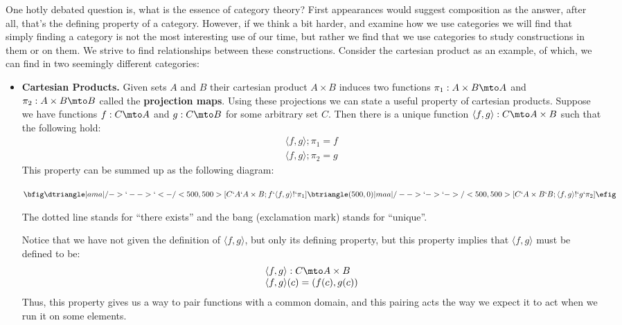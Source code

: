 One hotly debated question is, what is the essence of category theory?
First appearances would suggest composition as the answer, after all,
that's the defining property of a category.  However, if we think a
bit harder, and examine how we use categories we will find that simply
finding a category is not the most interesting use of our time, but
rather we find that we use categories to study constructions in them
or on them.  We strive to find relationships between these
constructions.  Consider the cartesian product as an example, of
which, we can find in two seemingly different categories:
\begin{itemize}
\item \textbf{Cartesian Products.} Given sets $A$ and $B$ their
  cartesian product $A \times B$ induces two functions $\pi_1 : A
  \times B \mto A$ and $\pi_2 : A \times B \mto B$ called the
  \textbf{projection maps}. Using these projections we can state a
  useful property of cartesian products.  Suppose we have functions $f
  : C \mto A$ and $g : C \mto B$ for some arbitrary set $C$.  Then
  there is a unique function $\langle f,g \rangle : C \mto A \times B$
  such that the following hold:
  \[
  \begin{array}{lll}
    \langle f,g \rangle;\pi_1 = f\\
    \langle f,g \rangle;\pi_2 = g
  \end{array}
  \]
  This property can be summed up as the following diagram:
  \begin{center}
    \begin{math}
      \bfig
      \dtriangle|ama|/->`-->`<-/<500,500>[C`A`A \times B;f`\langle f,g \rangle!`\pi_1]
      \btriangle(500,0)|maa|/-->`->`->/<500,500>[C`A \times B`B;\langle f,g \rangle!`g`\pi_2]
      \efig
    \end{math}
  \end{center}
  The dotted line stands for ``there exists'' and the bang (exclamation
  mark) stands for ``unique''.

  Notice that we have not given the definition of $\langle f,g \rangle$,
  but only its defining property, but this property
  implies that $\langle f,g \rangle$ must be defined to be:
  \[
  \begin{array}{lll}
    \langle f,g \rangle : C \mto A \times B\\
    \langle f,g \rangle(c) = (f(c),g(c))
  \end{array}
  \]
  Thus, this property gives us a way to pair functions with a common
  domain, and this pairing acts the way we expect it to act when we run
  it on some elements.


\end{itemize}
